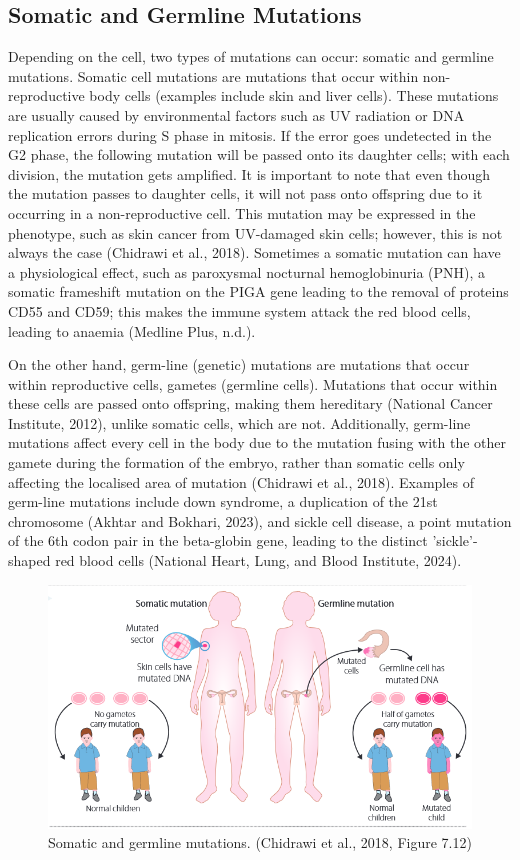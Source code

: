 \documentclass{mva_style}
\begin{document}
\subsection{Somatic and Germline Mutations}
Depending on the cell, two types of mutations can occur: somatic and germline mutations.
Somatic cell mutations are mutations that occur within non-reproductive body cells (examples include skin and liver cells). These mutations are usually caused by environmental factors such as UV radiation or DNA replication errors during S phase in mitosis. If the error goes undetected in the G2 phase, the following mutation will be passed onto its daughter cells; with each division, the mutation gets amplified. It is important to note that even though the mutation passes to daughter cells, it will not pass onto offspring due to it occurring in a non-reproductive cell. This mutation may be expressed in the phenotype, such as skin cancer from UV-damaged skin cells; however, this is not always the case (Chidrawi et al., 2018). Sometimes a somatic mutation can have a physiological effect, such as paroxysmal nocturnal hemoglobinuria (PNH), a somatic frameshift mutation on the PIGA gene leading to the removal of proteins CD55 and CD59; this makes the immune system attack the red blood cells, leading to anaemia (Medline Plus, n.d.).

On the other hand, germ-line (genetic) mutations are mutations that occur within reproductive cells, gametes (germline cells). Mutations that occur within these cells are passed onto offspring, making them hereditary (National Cancer Institute, 2012), unlike somatic cells, which are not. Additionally, germ-line mutations affect every cell in the body due to the mutation fusing with the other gamete during the formation of the embryo, rather than somatic cells only affecting the localised area of mutation (Chidrawi et al., 2018). Examples of germ-line mutations include down syndrome, a duplication of the 21st chromosome (Akhtar and Bokhari, 2023), and sickle cell disease, a point mutation of the 6th codon pair in the beta-globin gene, leading to the distinct ’sickle’-shaped red blood cells (National Heart, Lung, and Blood Institute, 2024). 

\begin{figure}
    \centering
    \includegraphics[width=0.8\linewidth]{img/Chidrawi et al., 2018, Figure 7.12.png}
    \caption{Somatic and germline mutations. (Chidrawi et al., 2018, Figure 7.12)}
    \label{fig:enter-label}
\end{figure}
\end{document}
